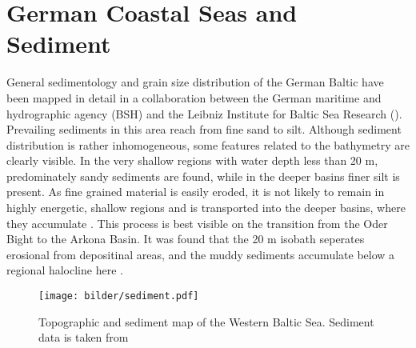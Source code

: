 \section{German Coastal Seas and Sediment}

General sedimentology and grain size distribution of the German Baltic have 
been mapped in detail in a collaboration between the German maritime and 
hydrographic agency (BSH) and the Leibniz Institute for Baltic Sea Research 
(). Prevailing sediments in this area reach from 
fine sand to silt. Although sediment distribution is rather inhomogeneous, some 
features related to the bathymetry are clearly visible. In the very shallow 
regions with water depth less than 20 m, predominately sandy sediments are 
found, while in the deeper basins finer silt is present.
As fine grained material is easily eroded, it is not likely to remain in highly 
energetic, shallow regions and is transported into the deeper basins, where 
they accumulate \citep[][]{basys1}. This process is best visible on the 
transition from the Oder Bight to the Arkona Basin. It was found that the 20 m 
isobath seperates erosional from depositinal areas, and the muddy sediments 
accumulate below a regional halocline here \citep[][]{basys2}.

\begin{figure}[ht]
 \flushleft
 \texttt{[image: bilder/sediment.pdf]}
 \caption{Topographic and sediment map of the Western Baltic 
Sea. Sediment data is taken from \citep[][]{tauber20xx}}\label{westernbaltic}
\end{figure}